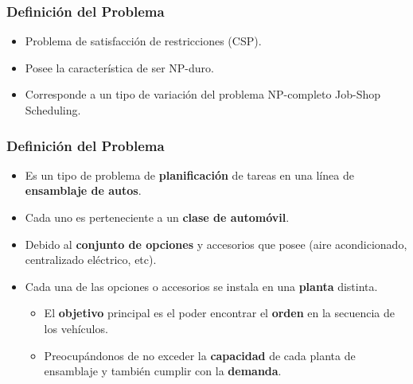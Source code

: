 
\frame
{
\frametitle{Definición del Problema}
\begin{itemize}
	\item Problema de satisfacción de restricciones (CSP).
 	\item Posee la característica de ser NP-duro.
	\item Corresponde a un tipo de variación del problema NP-completo Job-Shop Scheduling. 
\end{itemize}
}

\frame
{
\frametitle{Definición del Problema}
\begin{itemize}
	\item Es un tipo de problema de {\bf planificación} de tareas en una línea de {\bf ensamblaje de autos}.
 	\item Cada uno es perteneciente a un {\bf clase de automóvil}.
	\item Debido al {\bf conjunto de opciones} y accesorios que posee (aire acondicionado, centralizado eléctrico, etc).
 	\item Cada una de las opciones o accesorios se instala en una {\bf planta} distinta.
	\begin{itemize}
		\item El {\bf objetivo} principal es el poder encontrar el {\bf orden} en la secuencia de los vehículos.
		\item Preocupándonos de no exceder la {\bf capacidad} de cada planta de ensamblaje y también cumplir con la {\bf demanda}.
	\end{itemize}
\end{itemize}
}

